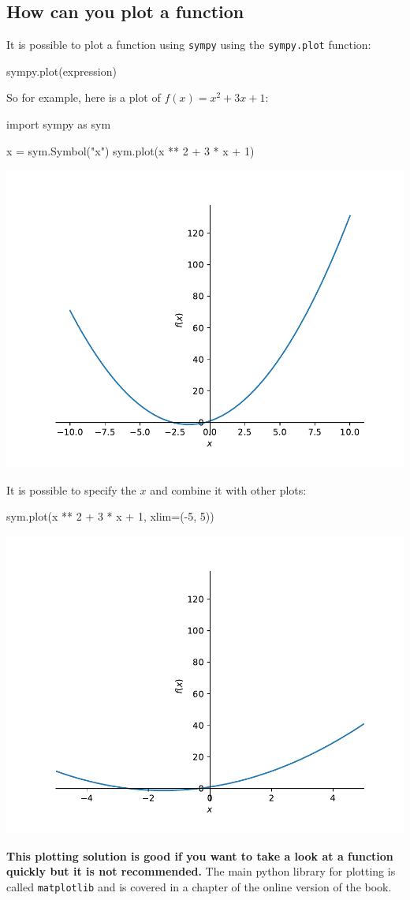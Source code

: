 \subsection{How can you plot a function}
\label{\detokenize{tools-for-mathematics/03-calculus/why/main:how-can-you-plot-a-function}}

It is possible to plot a function using \texttt{sympy} using the \texttt{sympy.plot} function:


\begin{api}
sympy.plot(expression)
\end{api}



So for example, here is a plot of \(f(x)=x^2 + 3x + 1\):





\begin{pyin}
import sympy as sym

x = sym.Symbol("x")
sym.plot(x ** 2 + 3 * x + 1)
\end{pyin}


\begin{center}
    \includegraphics[width=.7\textwidth]{./assets/plotting_with_sympy/main.pdf}
\end{center}

It is possible to specify the \(x\)  and combine it with other plots:

\begin{pyin}
sym.plot(x ** 2 + 3 * x + 1, xlim=(-5, 5))
\end{pyin}

\begin{center}
    \includegraphics[width=.7\textwidth]{./assets/plotting_with_sympy_with_xlim/main.pdf}
\end{center}




\textbf{This plotting solution is good if you want to take a look at a function
quickly but it is not recommended.} The main python library for plotting is called
\texttt{matplotlib} and is covered in a chapter of the online version of the
book.
